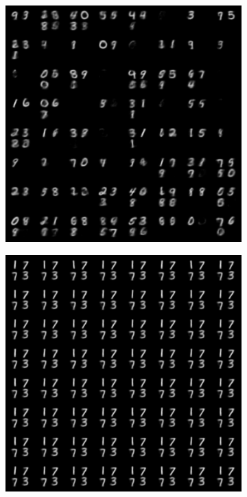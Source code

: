 \documentclass{article}
\begin{document}
\begin{figure}[!h]
\centering
    \begin{subfigure}[b]{.24\linewidth}
        \centering
        \includegraphics[width=\linewidth]{multimnist_mmvae_image_sample.png}
        \caption{}
    \end{subfigure}
    \begin{subfigure}[b]{.24\linewidth}
        \centering
        \includegraphics[width=\linewidth]{multimnist_mmvae_condition_image_text_1773_image_sample.png}

\end{subfigure}
\end{figure}
\end{document}

